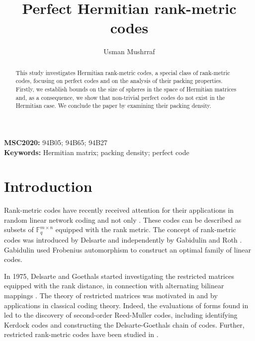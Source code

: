 \documentclass[12pt,a4paper]{article}
\begin{document}
\title{Perfect Hermitian rank-metric codes}

\author{Usman Mushrraf}

 


\maketitle
\begin{abstract}
This study investigates Hermitian rank-metric codes, a special class of rank-metric codes, focusing on perfect codes and on the analysis of their packing properties. Firstly, we establish bounds on the size of spheres in the space of Hermitian matrices and, as a consequence, we show that non-trivial perfect codes do not exist in the Hermitian case. We conclude the paper by examining their {packing density}. 
\end{abstract}

\noindent\textbf{MSC2020:}{ 94B05; 94B65; 94B27 }\\
\textbf{Keywords:}{ Hermitian  matrix; {packing density}; perfect code }
%
 
\section{Introduction}\label{Sec: 1}
Rank-metric codes have recently received attention for their applications in random linear network coding and not only \cite{koetter2008coding,silva2008rank,gabidulin2010correcting,bartz2022rank}. These codes can be described as subsets of $\mathbb{F}^{m \times n}_{q}$ equipped with the rank metric. The concept of rank-metric codes was introduced by  Delsarte \cite{delsarte1978bilinear} and independently by Gabidulin \cite{gabidulin1985theory} and Roth \cite{roth1991maximum}. Gabidulin used Frobenius automorphism to construct an optimal family of linear codes.     

In 1975, Delsarte and Goethals started investigating the restricted matrices equipped with the rank distance, in connection with alternating bilinear mappings \cite{delsarte1975alternating}. The theory of restricted matrices was motivated in \cite{delsarte1978bilinear} and \cite{delsarte1975alternating} by applications in classical coding theory. Indeed, the evaluations of forms found in \cite{delsarte1975alternating} led to the discovery of second-order Reed-Muller codes, including identifying Kerdock codes and constructing the Delsarte-Goethals chain of codes. Further, restricted rank-metric codes have been studied in
\cite{zhou2020equivalence,  trombetti2021maximum, bik2023higher, gabidulin2004symmetric, kadir2022encoding, mushrraf2024perfect, schmidt2010symmetric, puchinger2018construction, de2021hermitian, abiad2024eigenvalue, gruica2023rank}.
\end{document}
